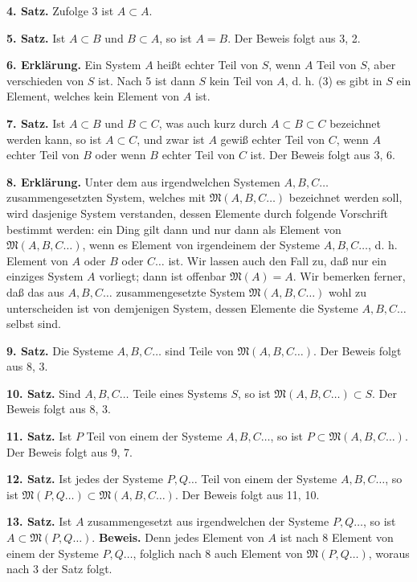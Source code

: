 \documentclass[11pt]{article}
\newcommand{\Mf}{\mathfrak{M}}
\newcommand{\partof}{\mathrel{\subset}}
\begin{document}
\noindent\textbf{4. Satz.} Zufolge 3 ist $A\partof A$.

\noindent\textbf{5. Satz.} Ist $A\partof B$ und $B\partof A$, so ist $A=B$. Der Beweis folgt aus 3, 2.

\noindent\textbf{6. Erklärung.} Ein System $A$ heißt echter Teil von $S$, wenn $A$ Teil von $S$, aber verschieden von $S$ ist. Nach 5 ist dann $S$ kein Teil von $A$, d. h. (3) es gibt in $S$ ein Element, welches kein Element von $A$ ist.

\noindent\textbf{7. Satz.} Ist $A\partof B$ und $B\partof C$, was auch kurz durch $A\partof B\partof C$ bezeichnet werden kann, so ist $A\partof C$, und zwar ist $A$ gewiß echter Teil von $C$, wenn $A$ echter Teil von $B$ oder wenn $B$ echter Teil von $C$ ist. Der Beweis folgt aus 3, 6.

\noindent\textbf{8. Erklärung.} Unter dem aus irgendwelchen Systemen $A,B,C\ldots$ zusammengesetzten System, welches mit $\Mf(A,B,C\ldots)$ bezeichnet werden soll, wird dasjenige System verstanden, dessen Elemente durch folgende Vorschrift bestimmt werden: ein Ding gilt dann und nur dann als Element von $\Mf(A,B,C\ldots)$, wenn es Element von irgendeinem der Systeme $A,B,C\ldots$, d. h. Element von $A$ oder $B$ oder $C\ldots$ ist. Wir lassen auch den Fall zu, daß nur ein einziges System $A$ vorliegt; dann ist offenbar $\Mf(A)=A$. Wir bemerken ferner, daß das aus $A,B,C\ldots$ zusammengesetzte System $\Mf(A,B,C\ldots)$ wohl zu unterscheiden ist von demjenigen System, dessen Elemente die Systeme $A,B,C\ldots$ selbst sind.

\noindent\textbf{9. Satz.} Die Systeme $A,B,C\ldots$ sind Teile von $\Mf(A,B,C\ldots)$. Der Beweis folgt aus 8, 3.

\noindent\textbf{10. Satz.} Sind $A,B,C\ldots$ Teile eines Systems $S$, so ist $\Mf(A,B,C\ldots)\partof S$. Der Beweis folgt aus 8, 3.

\noindent\textbf{11. Satz.} Ist $P$ Teil von einem der Systeme $A,B,C\ldots$, so ist $P\partof\Mf(A,B,C\ldots)$. Der Beweis folgt aus 9, 7.

\noindent\textbf{12. Satz.} Ist jedes der Systeme $P,Q\ldots$ Teil von einem der Systeme $A,B,C\ldots$, so ist $\Mf(P,Q\ldots)\partof\Mf(A,B,C\ldots)$. Der Beweis folgt aus 11, 10.

\noindent\textbf{13. Satz.} Ist $A$ zusammengesetzt aus irgendwelchen der Systeme $P,Q\ldots$, so ist $A\partof\Mf(P,Q\ldots)$. \textbf{Beweis.} Denn jedes Element von $A$ ist nach 8 Element von einem der Systeme $P,Q\ldots$, folglich nach 8 auch Element von $\Mf(P,Q\ldots)$, woraus nach 3 der Satz folgt.
\end{document}
